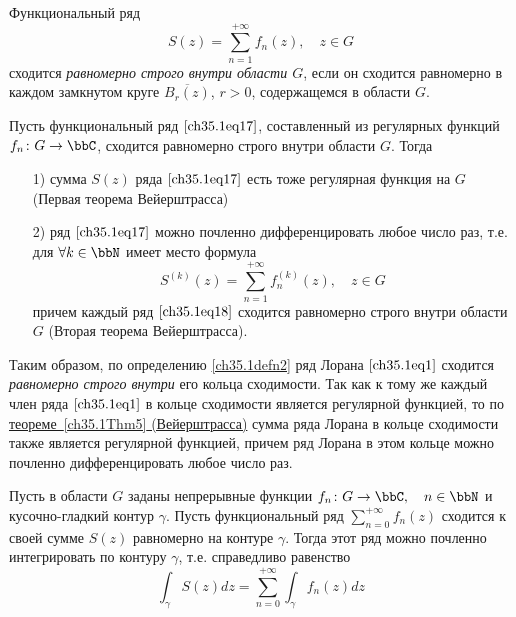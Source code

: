 \begin{defn}\label{ch35.1defn2} 
Функциональный ряд 
\begin{equation} \label{ch35.1eq17}
S(z)=\sum\limits_{n=1}^{+\infty} f_n(z), \quad z\in G
\end{equation}
 сходится \textit{равномерно строго внутри области $G$}, если он сходится равномерно в каждом замкнутом круге $\overline{B_r(z)}$, $r>0$, содержащемся в области $G$.
\end{defn}

\begin{thm} \label{ch35.1Thm5}
Пусть функциональный ряд $\eqref{ch35.1eq17}$, составленный из регулярных функций $f_n\colon G \to \bbC$, сходится равномерно строго внутри области $G$. Тогда
\begin{enumerate}
	\item[1)] {\rightskip=3.5cm} {сумма $S(z)$ ряда $\eqref{ch35.1eq17}$ есть тоже регулярная функция на $G$ (Первая теорема Вейерштрасса)
	}
	\item[2)] {\rightskip=0cm}{ряд $\eqref{ch35.1eq17}$ можно почленно дифференцировать любое число раз, т.е. для $\forall k \in \bbN$ имеет место формула 
	\begin{equation} \label{ch35.1eq18}
	S^{(k)}(z) = \sum\limits_{n=1}^{+\infty} f_{n}^{(k)}(z), \quad z \in G
	\end{equation}
	причем каждый ряд $\eqref{ch35.1eq18}$ сходится равномерно строго внутри области $G$ (Вторая теорема Вейерштрасса).	}
\end{enumerate}
\end{thm}

Таким образом, по определению \ref{ch35.1defn2} ряд Лорана $\eqref{ch35.1eq1}$ сходится \textit{равномерно строго внутри} его кольца сходимости. Так как к тому же каждый член ряда $\eqref{ch35.1eq1}$ в кольце сходимости является регулярной функцией, то по  \hyperref[ch35.1Thm5]{теореме~\ref{ch35.1Thm5} (Вейерштрасса)} сумма ряда Лорана в кольце сходимости также является регулярной функцией, причем ряд Лорана в этом кольце можно почленно дифференцировать любое число раз.

\begin{thm} \label{ch35.1Thm6}
Пусть в области $G$ заданы непрерывные функции $f_n\colon G \to \bbC,\quad n \in \bbN$ и кусочно-гладкий контур $\gamma$. Пусть функциональный ряд $\sum\limits_{n=0}^{+\infty} f_n(z)$ сходится к своей сумме $S(z)$ равномерно на контуре $\gamma$. Тогда этот ряд можно почленно интегрировать по контуру $\gamma$, т.е. справедливо равенство
\begin{equation}
\int_{\gamma} S(z)dz = \sum\limits_{n=0}^{+\infty} \int_{\gamma} f_n(z)dz
\end{equation}
\end{thm} 

